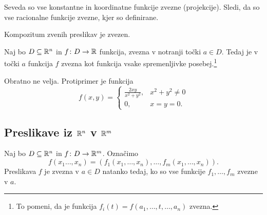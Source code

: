 \obvs

\begin{opomba}
Seveda so vse konstantne in koordinatne funkcije zvezne (projekcije). Sledi, da so vse racionalne funkcije zvezne, kjer so definirane.
\end{opomba}

\begin{opomba}
Kompozitum zvenih preslikav je zvezen.
\end{opomba}

\begin{izrek}
Naj bo $D\subseteq\mathbb{R}^n$ in $f\colon D\to\mathbb{R}$ funkcija, zvezna v notranji točki $a\in D$. Tedaj je v točki $a$ funkcija $f$ zvezna kot funkcija vsake spremenljivke posebej.\footnote{To pomeni, da je funkcija $f_i(t)=f(a_1,\dots,t,\dots,a_n)$ zvezna.}
\end{izrek}

\obvs

\begin{opomba}
Obratno ne velja. Protiprimer je funkcija
\[
f(x,y)=\begin{cases}
\frac{2xy}{x^2+y^2},& x^2+y^2\ne 0 \\
0,& x=y=0.
\end{cases}
\]
\end{opomba}

\newpage

\subsection{Preslikave iz $\mathbb{R}^n$ v $\mathbb{R}^m$}

\begin{trditev}
Naj bo $D\subseteq\mathbb{R}^n$ in $f\colon D\to\mathbb{R}^m$. Označimo
\[
f(x_1\dots,x_n)=\left(f_1(x_1,\dots,x_n),\dots,f_m(x_1,\dots,x_n)\right).
\]
Preslikava $f$ je zvezna v $a\in D$ natanko tedaj, ko so vse funkcije $f_1,\dots,f_m$ zvezne v $a$.
\end{trditev}